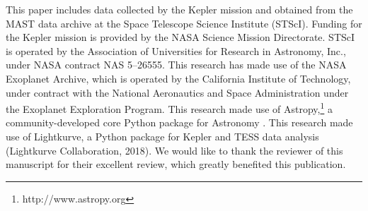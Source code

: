 \documentclass[iop]{emulateapj}
\begin{document}
This paper includes data collected by the Kepler mission and obtained from the MAST data archive at the Space Telescope Science Institute (STScI). Funding for the Kepler mission is provided by the NASA Science Mission Directorate. STScI is operated by the Association of Universities for Research in Astronomy, Inc., under NASA contract NAS 5–26555. This research has made use of the NASA Exoplanet Archive, which is operated by the California Institute of Technology, under contract with the National Aeronautics and Space Administration under the Exoplanet Exploration Program. This research made use of Astropy,\footnote{http://www.astropy.org} a community-developed core Python package for Astronomy \citep{astropy2013, astropy2018}. This research made use of Lightkurve, a Python package for Kepler and TESS data analysis (Lightkurve Collaboration, 2018). We would like to thank the reviewer of this manuscript for their excellent review, which greatly benefited this publication.

\appendix




\end{document}
